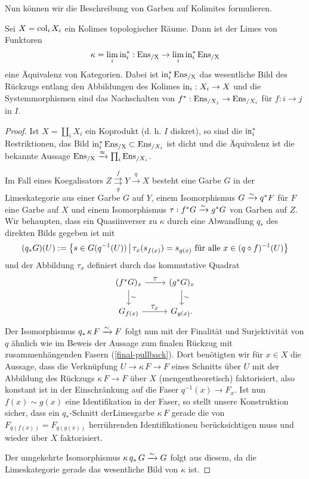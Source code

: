 Nun können wir die Beschreibung von Garben auf Kolimites formulieren.
\begin{satz} \label{sheaf-col}
  Sei $X = \operatorname{col}_i X_i$ ein Kolimes topologischer Räume. Dann ist der
  Limes von Funktoren
  \[ \kappa = \lim_i \operatorname{in}_i^*: \operatorname{Ens_{/X}} \to \lim_i \operatorname{in}_i^* \operatorname{Ens_{/X}} \]
  eine Äquivalenz von Kategorien. Dabei ist $\operatorname{in}_i^* \operatorname{Ens_{/X}}$ das
  wesentliche Bild des Rückzugs entlang den Abbildungen des Kolimes
  $\operatorname{in}_i: X_i \to X$ und die Systemmorphismen sind das Nachschalten
  von $f^*: \operatorname{Ens}_{/X_j} \to \operatorname{Ens}_{/X_i}$ für $f: i \to j$ in $I$.
\end{satz}
\begin{proof}
  Ist $X = \coprod_i X_i$ ein Koprodukt (d. h. $I$ diskret), so sind
  die $\operatorname{in}_i^*$ Restriktionen, das Bild $\operatorname{in}_i^* \operatorname{Ens_{/X}} \subset
  \operatorname{Ens}_{/X_i}$ ist dicht und die Äquivalenz ist die bekannte Aussage
  $\operatorname{Ens_{/X}} \xrightarrow{\approx} \prod_i \operatorname{Ens}_{/X_i}$.

  Im Fall eines Koegalisators $Z
  \overset{f}{\underset{g}{\rightrightarrows}} Y \xrightarrow{q} X$
  besteht eine Garbe $G$ in der Limeskategorie aus einer Garbe $G$ auf
  $Y$, einem Isomorphismus $G \xrightarrow[]{\sim} q^* F$ für $F$ eine Garbe auf $X$
  und einem Isomorphismus $\tau: f^* G \xrightarrow[]{\sim} g^* G$ von Garben auf
  $Z$. Wir behaupten, dass ein Quasiinverser zu $\kappa$ durch eine
  Abwandlung $q_*$ des direkten Bilds gegeben ist mit
  \[ (q_* G)(U) := \left\{ s \in G(q^{-1}(U)) \,\middle|\, \tau_x(s_{f(x)}) = s_{g(x)}
    \text{ für alle } x \in (q \circ f)^{-1}(U)  \right\}
  \]
  und der Abbildung $\tau_x$ definiert durch das kommutative Quadrat
  \[
  \begin{tikzcd}
    (f^* G)_x \dar{\sim} \rar{\textstyle\tau} & (g^* G)_x \dar{\sim} \\
    G_{f(x)} \rar{\textstyle\tau_x} & G_{g(x)}.
  \end{tikzcd}
  \]
  Der Isomorphismus $q_* \, \kappa \, F \xrightarrow[]{\sim} F$ folgt nun mit der
  Finalität und Surjektivität von $q$ ähnlich wie im Beweis der
  Aussage zum finalen Rückzug mit zusammenhängenden Fasern
  (\ref{final-pullback}). Dort benötigten wir für $x \in X$ die
  Aussage, dass die Verknüpfung $U \to \kappa \,F \to F$ eines
  Schnitts über $U$ mit der Abbildung des Rückzugs $\kappa \, F \to F$
  über $X$ (mengentheoretisch) faktorisiert, also konstant ist in der
  Einschränkung auf die Faser $q^{-1}(x) \to F_x$. Ist nun $f(x) \sim
  g(x)$ eine Identifikation in der Faser, so stellt unsere
  Konstruktion sicher, dass ein $q_*$-Schnitt derLimesgarbe $\kappa \,
  F$ gerade die von $F_{q(f(x))} = F_{q(g(x))}$ herrührenden
  Identifikationen berücksichtigen muss und wieder über $X$
  faktorisiert.

  Der umgekehrte Isomorphismus $\kappa \, q_* \, G \xrightarrow[]{\sim} G$ folgt aus
  diesem, da die Limeskategorie gerade das wesentliche Bild von
  $\kappa$ ist.
\end{proof}
